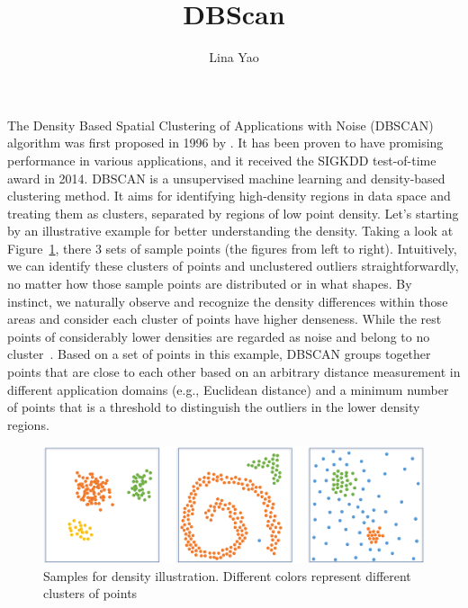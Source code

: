 \title{DBScan}
\label{chp:dbscan}
\author{Lina Yao}
\maketitle


The Density Based Spatial Clustering of Applications with Noise (DBSCAN) 
algorithm was first proposed in 1996 by \cite{ester1996density}. It has been 
proven to have promising performance in various applications, and it received 
the SIGKDD test-of-time award in 2014.  DBSCAN is a unsupervised machine learning and density-based clustering method. 
It aims for identifying high-density regions in data space and treating them as 
clusters, separated by regions of low point density. Let's starting by an 
illustrative example for better understanding the density. Taking a look at Figure~\ref{fig:exampledb}, there 3 sets of sample points (the figures from left to right). Intuitively, we can identify these clusters of points and unclustered outliers straightforwardly, no matter how those sample points are distributed or in what shapes. By instinct, we naturally observe and recognize the density differences within those areas and consider each cluster of points have higher denseness. While the rest points of considerably lower densities are regarded as noise and belong to no cluster~\cite{ester1996density}. Based on a set of points in this 
example, DBSCAN groups together points that are close to each other based on an 
arbitrary distance measurement in different application domains 
(e.g., Euclidean distance) and a minimum number of points that is a threshold to 
distinguish the outliers in the lower density regions. 


\begin{figure}[tbp]
	\centering
	\includegraphics[width=\textwidth]{"Part 3 - Learning Systems/Unsupervised Learning/DBScan/figures/example_density.png"}
	\caption{Samples for density illustration. Different colors represent different clusters of points}
	\label{fig:exampledb}
\end{figure}


